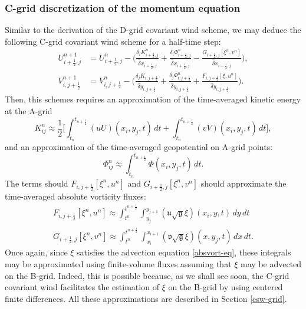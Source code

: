 \subsubsection{C-grid discretization of the momentum equation }
Similar to the derivation of the  D-grid covariant wind scheme, we may deduce the following C-grid covariant wind scheme for a half-time step:
\begin{align}
	\label{2d-sweq-cscheme-u}
	{U}_{i+\frac{1}{2},j}^{n+1}&=
	{U}_{i+\frac{1}{2},j}^{n} - \bigg(
	\frac{\delta_i K_{i+\frac{1}{2},j}^n}{\hat{\delta} x_{i+\frac{1}{2},j}}
	+\frac{\delta_i \Phi_{i+\frac{1}{2},j}^n}{\hat{\delta} x_{i+\frac{1}{2},j}} -
    \frac{G_{i+\frac{1}{2},j}[\xi^{n}, v^n]}{\hat{\delta} x_{i+\frac{1}{2},j}}\bigg),\\
	\label{2d-sweq-cscheme-v}
	{V}_{i,j+\frac{1}{2}}^{n+1}&=
	{V}_{i,j+\frac{1}{2}}^{n} - \bigg(
	\frac{\delta_j K_{i,j+\frac{1}{2}}}{\hat{\delta} y_{i,j+\frac{1}{2}}}+
	\frac{\delta_j \Phi_{{i,j+\frac{1}{2}}}^n}{\hat{\delta} y_{i,j+\frac{1}{2}}}
	+
   \frac{F_{i,j+\frac{1}{2}}[\xi, u^n]}{\hat{\delta} y_{i,j+\frac{1}{2}}}\bigg).
\end{align}
Then, this schemes requires an approximation of the time-averaged kinetic energy at the A-grid
\begin{equation}
	\label{ke-agrid}
	K_{ij}^n \approx \frac{1}{2}\bigg[
	\int_{t_{n}}^{t_{n+\frac{1}{2}}} ({u}{U})
	(x_{i}, y_{j}, t) \,dt +
	\int_{t_{n}}^{t_{n+\frac{1}{2}}} ({v}{V})
	(x_{i}, y_{j}, t) \,dt\bigg],
\end{equation}
and an approximation of the time-averaged geopotential on A-grid points:
\begin{equation}
	\label{geop-agrid}
	\Phi_{ij}^n \approx
	\int_{t_{n}}^{t_{n+\frac{1}{2}}} \Phi
	(x_{i}, y_{j}, t) \,dt.
\end{equation}
The terms should $F_{i,j+\frac{1}{2}}[\xi^{n}, u^n]$ and $G_{i+\frac{1}{2},j}[\xi^{n}, v^n] $ should approximate the time-averaged absolute vorticity fluxes:
\begin{align}
	F_{i,j+\frac{1}{2}}[\xi^{n}, u^n] \approx
	\int_{t^n}^{t^{n+\frac{1}{2}}} 
	\int_{y_{j}}^{y_{j+1}} 
	{(\mathfrak{u}\sqrt{\mathfrak{g}}\xi)(x_{i}, y, t)}
	\,dy \,dt \\
	G_{i+\frac{1}{2},j}[\xi^{n}, v^n] \approx
	\int_{t^n}^{t^{n+\frac{1}{2}}} 
	\int_{x_{i}}^{x_{i+1}} 
	{(\mathfrak{v}\sqrt{\mathfrak{g}}\xi)(x, y_{j}, t)}
	\,dx \,dt.
\end{align}
Once again, since $\xi$ satisfies the advection equation \eqref{absvort-eq}, 
these integrals may be approximated using finite-volume fluxes assuming that $\xi$ may be advected on the B-grid.
Indeed, this is possible because, as we shall see soon, the C-grid covariant wind facilitates the estimation of $\xi$ on the B-grid by using centered finite differences.
All these approximations are described in Section \ref{csw-grid}.

